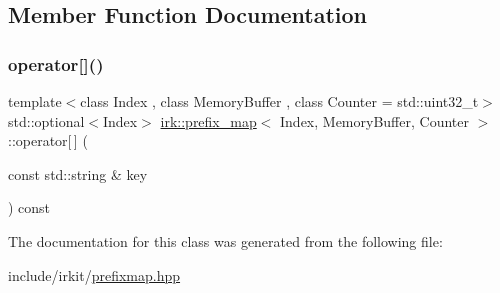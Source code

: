 \subsection{Member Function Documentation}
\mbox{\label{classirk_1_1prefix__map_af8c0c9c8a7bc1b31d03111e714aaec2b}} 
\subsubsection{\texorpdfstring{operator[]()}{operator[]()}}
{\footnotesize\ttfamily template$<$class Index , class Memory\+Buffer , class Counter  = std\+::uint32\+\_\+t$>$ \\
std\+::optional$<$Index$>$ \mbox{\hyperlink{classirk_1_1prefix__map}{irk\+::prefix\+\_\+map}}$<$ Index, Memory\+Buffer, Counter $>$\+::operator\mbox{[}$\,$\mbox{]} (\begin{DoxyParamCaption}\item[{const std\+::string \&}]{key }\end{DoxyParamCaption}) const\hspace{0.3cm}{\ttfamily [inline]}}



The documentation for this class was generated from the following file\+:\begin{DoxyCompactItemize}
\item 
include/irkit/\mbox{\hyperlink{prefixmap_8hpp}{prefixmap.\+hpp}}\end{DoxyCompactItemize}
